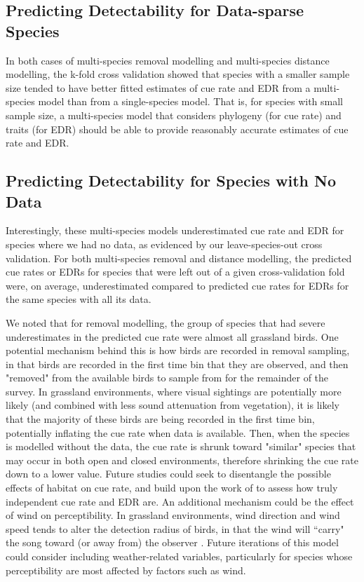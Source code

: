 \documentclass[12pt]{article}
\begin{document}
\subsection{Predicting Detectability for Data-sparse Species}

\par In both cases of multi-species removal modelling and multi-species distance modelling, the k-fold cross validation showed that species with a smaller sample size tended to have better fitted estimates of cue rate and EDR from a multi-species model than from a single-species model.
That is, for species with small sample size, a multi-species model that considers phylogeny (for cue rate) and traits (for EDR) should be able to provide reasonably accurate estimates of cue rate and EDR.

\subsection{Predicting Detectability for Species with No Data}\label{discussion-nodata}

\par Interestingly, these multi-species models underestimated cue rate and EDR for species where we had no data, as evidenced by our leave-species-out cross validation.
For both multi-species removal and distance modelling, the predicted cue rates or EDRs for species that were left out of a given cross-validation fold were, on average, underestimated compared to predicted cue rates for EDRs for the same species with all its data.

\par We noted that for removal modelling, the group of species that had severe underestimates in the predicted cue rate were almost all grassland birds.
One potential mechanism behind this is how birds are recorded in removal sampling, in that birds are recorded in the first time bin that they are observed, and then "removed" from the available birds to sample from for the remainder of the survey.
In grassland environments, where visual sightings are potentially more likely (and combined with less sound attenuation from vegetation), it is likely that the majority of these birds are being recorded in the first time bin, potentially inflating the cue rate when data is available.
Then, when the species is modelled without the data, the cue rate is shrunk toward "similar" species that may occur in both open and closed environments, therefore shrinking the cue rate down to a lower value.
Future studies could seek to disentangle the possible effects of habitat on cue rate, and build upon the work of \citet{martin-schwarze_joint_2021} to assess how truly independent cue rate and EDR are.
An additional mechanism could be the effect of wind on perceptibility.
In grassland environments, wind direction and wind speed tends to alter the detection radius of birds, in that the wind will ``carry" the song toward (or away from) the observer \citep{rigby_factors_2019}.
Future iterations of this model could consider including weather-related variables, particularly for species whose perceptibility are most affected by factors such as wind.
\end{document}
